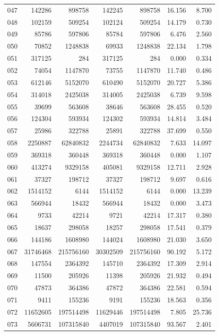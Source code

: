 \begin{longtable}{lrrrrrr}
047 & 142286 & 898758 & 142245 & 898758 & 16.156 & 8.700\\
048 & 102159 & 509254 & 102124 & 509254 & 14.179 & 0.730\\
049 & 85786 & 597806 & 85784 & 597806 & 6.476 & 2.560\\
050 & 70852 & 1248838 & 69933 & 1248838 & 22.134 & 1.798\\
051 & 317125 & 284 & 317125 & 284 & 0.000 & 0.334\\
052 & 74054 & 1147870 & 73755 & 1147870 & 11.740 & 0.486\\
053 & 612146 & 5152070 & 610490 & 5152070 & 20.727 & 5.386\\
054 & 314018 & 2425038 & 314005 & 2425038 & 6.739 & 9.598\\
055 & 39699 & 563608 & 38646 & 563608 & 28.455 & 0.520\\
056 & 124304 & 593934 & 124302 & 593934 & 14.814 & 3.484\\
057 & 25986 & 322788 & 25891 & 322788 & 37.699 & 0.550\\
058 & 2250887 & 62840832 & 2244734 & 62840832 & 7.633 & 14.097\\
059 & 369318 & 360448 & 369318 & 360448 & 0.000 & 1.107\\
060 & 413274 & 9329158 & 405081 & 9329158 & 12.711 & 2.928\\
061 & 37327 & 198712 & 37327 & 198712 & 9.697 & 0.616\\
062 & 1514152 & 6144 & 1514152 & 6144 & 0.000 & 13.239\\
063 & 566944 & 18432 & 566944 & 18432 & 0.000 & 3.473\\
064 & 9733 & 42214 & 9721 & 42214 & 17.317 & 0.380\\
065 & 18637 & 298058 & 18257 & 298058 & 17.541 & 0.379\\
066 & 144186 & 1608980 & 144024 & 1608980 & 21.030 & 3.650\\
067 & 31746468 & 215756160 & 30302509 & 215756160 & 90.192 & 5.172\\
068 & 147554 & 2364392 & 145710 & 2364392 & 17.309 & 2.914\\
069 & 11500 & 205926 & 11398 & 205926 & 21.932 & 0.494\\
070 & 47873 & 364386 & 47872 & 364386 & 22.581 & 0.594\\
071 & 9411 & 155236 & 9191 & 155236 & 18.563 & 0.356\\
072 & 11652605 & 197514498 & 11629446 & 197514498 & 7.805 & 25.736\\
073 & 5606731 & 107315840 & 4407019 & 107315840 & 93.567 & 2.401\\

\end{longtable}
